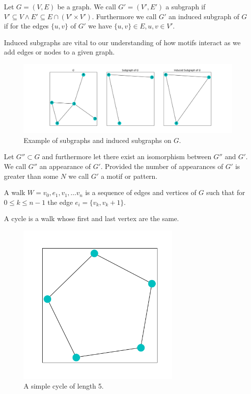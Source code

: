 \begin{dfn}
    Let $G=(V,E)$ be a graph. We call $G'=(V',E')$ a subgraph if
     $V' \subseteq V \land E' \subseteq E \cap (V' \times V')$. Furthermore we call $G'$
     an induced subgraph of $G$ if for the edges $\{u,v\}$ of $G'$ we have $\{u,v\} \in E, u,v \in V'$.
\end{dfn}

\noindent Induced subgraphs are vital to our understanding of how motifs interact as we add edges or nodes
to a given graph.

\begin{figure}[h!]
    \includegraphics[width=15cm]{Images/subgraph.png}
    \centering
    \caption{Example of subgraphs and induced subgraphs on $G$.}
\end{figure}

\begin{dfn}
    Let $G'' \subset G$ and furthermore let there exist an isomorphism between $G''$ and $G'$. We call
    $G''$ an appearance of $G'$. Provided the number of appearances of $G'$ is greater than some $N$ we call $G'$
    a motif or pattern.
\end{dfn}

\begin{dfn}
    A walk $W = {v_0, e_1, v_1, \dots v_n}$ is a sequence of edges and vertices of $G$ such that
    for $0 \leq k \leq n-1$ the edge $e_i = \{v_k, v_k+1\}$.
\end{dfn}

\begin{dfn}
    A cycle is a walk whose first and last vertex are the same.
\end{dfn}

\begin{figure}[h!]
    \includegraphics[width=8cm]{Images/Cycle.png}
    \centering
    \caption{A simple cycle of length 5.}
\end{figure}

